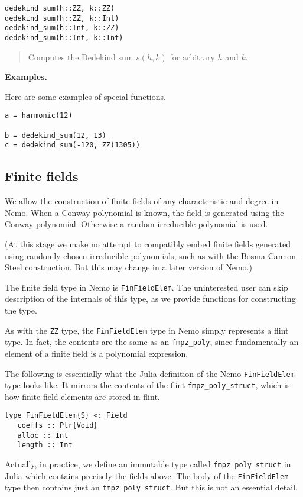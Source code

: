 \documentclass[a4paper,10pt]{article}
\newcommand{\code}{\lstinline}
\newcommand{\desc}[1]{\vspace{-3mm}\begin{quote}#1\end{quote}}
\begin{document}
{{\begin{lstlisting}
dedekind_sum(h::ZZ, k::ZZ)
dedekind_sum(h::ZZ, k::Int)
dedekind_sum(h::Int, k::ZZ)
dedekind_sum(h::Int, k::Int)
\end{lstlisting}

\desc{Computes the Dedekind sum $s(h,k)$ for arbitrary $h$ and $k$.}

\textbf{Examples.}

Here are some examples of special functions.

\begin{lstlisting}
a = harmonic(12)

b = dedekind_sum(12, 13)
c = dedekind_sum(-120, ZZ(1305))
\end{lstlisting}

\subsection{Finite fields}

We allow the construction of finite fields of any characteristic and degree in
Nemo. When a Conway polynomial is known, the field is generated using the 
Conway polynomial. Otherwise a random irreducible polynomial is used. 

(At this stage we make no attempt to compatibly embed finite fields generated 
using randomly chosen irreducible polynomials, such as with the 
Bosma-Cannon-Steel construction. But this may change in a later version of 
Nemo.) 

The finite field type in Nemo is \code{FinFieldElem}. The uninterested user can skip
description of the internals of this type, as we provide functions for 
constructing the type.

As with the \code{ZZ} type, the \code{FinFieldElem} type in Nemo simply represents a
flint type. In fact, the contents are the same as an \code{fmpz_poly}, since
fundamentally an element of a finite field is a polynomial expression.

The following is essentially what the Julia definition of the Nemo
\code{FinFieldElem} type looks like. It mirrors the contents of the
flint \code{fmpz_poly_struct}, which is how finite field elements are stored
in flint.

\begin{lstlisting}
type FinFieldElem{S} <: Field
   coeffs :: Ptr{Void}
   alloc :: Int
   length :: Int
\end{lstlisting}

Actually, in practice, we define an immutable type called 
\code{fmpz_poly_struct} in Julia which contains precisely the fields above. The
body of the \code{FinFieldElem} type then contains just an
\code{fmpz_poly_struct}. But this is not an essential detail.

}}
\end{document}
